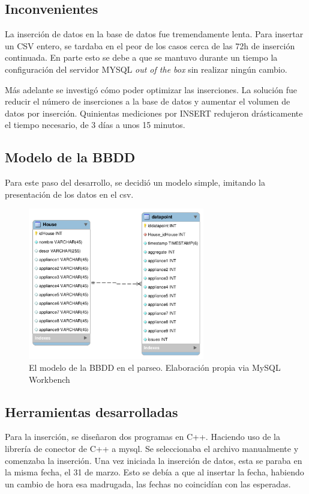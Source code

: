 \subsection{Inconvenientes}
La inserción de datos en la base de datos fue tremendamente lenta. Para insertar un CSV entero, se tardaba en el peor de los casos cerca de las 72h de inserción continuada.
En parte esto se debe a que se mantuvo durante un tiempo la configuración del servidor MYSQL \textit{out of the box} sin realizar ningún cambio.

Más adelante se investigó cómo poder optimizar las inserciones. La solución fue reducir el número de inserciones a la base de datos y aumentar el volumen de datos por inserción. Quinientas mediciones por INSERT redujeron drásticamente el tiempo necesario, de 3 días a unos 15 minutos.

\subsection{Modelo de la BBDD}
Para este paso del desarrollo, se decidió un modelo simple, imitando la presentación de los datos en el csv.
\begin{figure}
    \centering
    \includegraphics[height=250px]{images/db_parsingstep.png}
    \caption{El modelo de la BBDD en el parseo. Elaboración propia via MySQL Workbench}
    \label{diagramaBBDD}
\end{figure}

\subsection{Herramientas desarrolladas}
Para la inserción, se diseñaron dos programas en C++. Haciendo uso de la librería de conector de C++ a mysql. Se seleccionaba el archivo manualmente y comenzaba la inserción. 
Una vez iniciada la inserción de datos, esta se paraba en la misma fecha, el 31 de marzo. Esto se debía a que al insertar la fecha, habiendo un cambio de hora esa madrugada, las fechas no coincidían con las esperadas.

